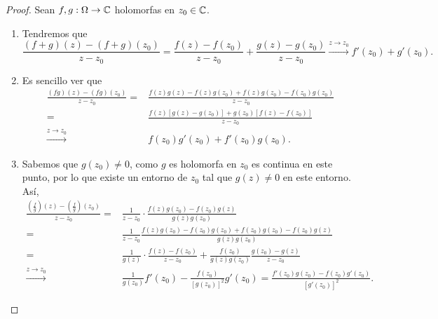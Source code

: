 \begin{proof}
Sean $\displaystyle f,g : \Omega \to \mathbb{C} $ holomorfas en $\displaystyle z_{0} \in \mathbb{C} $. 
\begin{enumerate}
\item Tendremos que 
	\[
		\frac{\left(f + g\right)\left(z\right)-\left(f + g\right)\left(z_{0}\right)}{z-z_{0}} = \frac{f\left(z\right)-f\left(z_{0}\right)}{z-z_{0}} + \frac{g\left(z\right)-g\left(z_{0}\right)}{z-z_{0}} \xrightarrow{z\to z_{0}} f'\left(z_{0}\right) + g'\left(z_{0}\right) .
	\]
\item Es sencillo ver que 
	\[
	\begin{split}
		\frac{\left(fg\right)\left(z\right)-\left(fg\right)\left(z_{0}\right)}{z-z_{0}} = & \frac{f\left(z\right)g\left(z\right)-f\left(z\right)g\left(z_{0}\right)+f\left(z\right)g\left(z_{0}\right)-f\left(z_{0}\right)g\left(z_{0}\right)}{z-z_{0}}\\
		= & \frac{f\left(z\right)\left[g\left(z\right)-g\left(z_{0}\right)\right] +g\left(z_{0}\right)\left[f\left(z\right)-f\left(z_{0}\right)\right] }{z-z_{0}}\\
		\xrightarrow{z \to z_{0}} & f\left(z_{0}\right)g'\left(z_{0}\right) + f'\left(z_{0}\right)g\left(z_{0}\right).
	\end{split}
	\]
\item Sabemos que $\displaystyle g\left(z_{0}\right) \neq 0 $, como $\displaystyle g $ es holomorfa en $\displaystyle z_{0} $ es continua en este punto, por lo que existe un entorno de $\displaystyle z_{0} $ tal que $\displaystyle g\left(z\right)\neq 0 $ en este entorno. Así, 
	\[
	\begin{split}
		\frac{\left(\frac{f}{g}\right)\left(z\right)-\left(\frac{f}{g}\right)\left(z_{0}\right)}{z-z_{0}} = & \frac{1}{z-z_{0}} \cdot \frac{f\left(z\right)g\left(z_{0}\right)-f\left(z_{0}\right)g\left(z\right)}{g\left(z\right)g\left(z_{0}\right)} \\
		= & \frac{1}{z-z_{0}}\frac{f\left(z\right)g\left(z_{0}\right)-f\left(z_{0}\right)g\left(z_{0}\right)+f\left(z_{0}\right)g\left(z_{0}\right)-f\left(z_{0}\right)g\left(z\right)}{g\left(z\right)g\left(z_{0}\right)} \\
		= & \frac{1}{g\left(z\right)} \cdot \frac{f\left(z\right)-f\left(z_{0}\right)}{z-z_{0}} + \frac{f\left(z_{0}\right)}{g\left(z\right)g\left(z_{0}\right)}\frac{g\left(z_{0}\right)-g\left(z\right)}{z-z_{0}} \\
		\xrightarrow{z \to z_{0}} & \frac{1}{g\left(z_{0}\right)}f'\left(z_{0}\right)-\frac{f\left(z_{0}\right)}{\left[g\left(z_{0}\right)\right] ^{2}} g'\left(z_{0}\right) = \frac{f'\left(z_{0}\right)g\left(z_{0}\right)-f\left(z_{0}\right)g'\left(z_{0}\right)}{\left[g'\left(z_{0}\right)\right] ^{2}}.
	\end{split}
	\]
\end{enumerate}
\end{proof}

